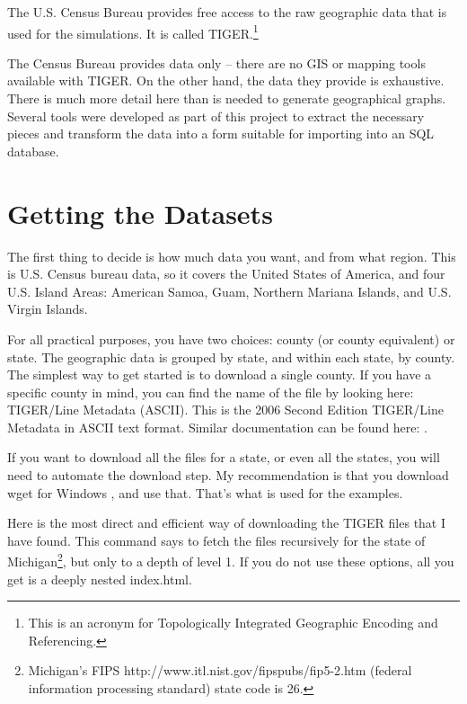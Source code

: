 \documentclass[11pt,letterpaper,onecolumn,twoside,openright,draft]{report}
\begin{document}
The U.S. Census Bureau provides free access to the raw geographic data that is used for the simulations.
It is called TIGER.\footnote{This is an acronym for Topologically Integrated Geographic Encoding and Referencing.}

The Census Bureau provides data only -- there are no GIS or mapping tools available with TIGER.
On the other hand, the data they provide is exhaustive.
There is much more detail here than is needed to generate geographical graphs.
Several tools were developed as part of this project to extract the necessary pieces and transform the data into a form suitable for importing into an SQL database.

\section{Getting the Datasets}
The first thing to decide is how much data you want, and from what region.
This is U.S. Census bureau data, so it covers the United States of America, and four U.S. Island Areas: American Samoa, Guam, Northern Mariana Islands, and U.S. Virgin Islands.

For all practical purposes, you have two choices: county (or county equivalent) or state.
The geographic data is grouped by state, and within each state, by county.
The simplest way to get started is to download a single county.
If you have a specific county in mind, you can find the name of the file by looking here: TIGER/Line Metadata (ASCII).
This is the 2006 Second Edition TIGER/Line Metadata in ASCII text format.
Similar documentation can be found here: .

If you want to download all the files for a state, or even all the states, you will need to automate the download step.
My recommendation is that you download wget for Windows , and use that.
That's what is used for the examples.

Here is the most direct and efficient way of downloading the TIGER files that I have found.
This command says to fetch the files recursively for the state of Michigan\footnote{Michigan's FIPS http://www.itl.nist.gov/fipspubs/fip5-2.htm (federal information processing standard) state code is 26.}, but only to a depth of level 1.
If you do not use these options, all you get is a deeply nested index.html.
\end{document}
